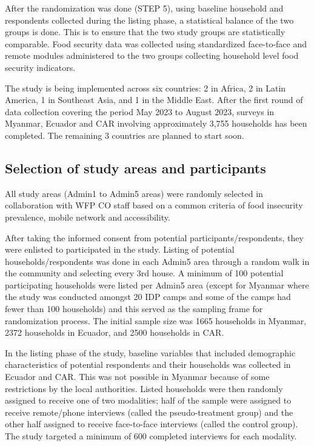 \documentclass[11pt,harvard]{article}
\begin{document}
After the randomization was done (STEP 5), using baseline household and respondents collected during the listing phase, a statistical balance of the two groups is done. This is to ensure that the two study groups are statistically comparable. Food security data was collected using standardized face-to-face and remote modules administered to the two groups collecting household level food security indicators. 

The study is being implemented across six countries: 2 in Africa, 2 in Latin America, 1 in Southeast Asia, and 1 in the Middle East. After the first round of data collection covering the period May 2023 to August 2023, surveys in Myanmar, Ecuador and CAR involving approximately 3,755 households has been completed. The remaining 3 countries are planned to start soon.

\subsection{Selection of study areas and participants}

All study areas (Admin1 to Admin5 areas) were randomly selected in collaboration with WFP CO staff based on a common criteria of food insecurity prevalence, mobile network and accessibility.

After taking the informed consent from potential participants/respondents, they were enlisted to participated in the study. Listing of potential households/respondents was done in each Admin5 area through a random walk in the community and selecting every 3rd house. A minimum of 100 potential participating households were listed per Admin5 area (except for Myanmar where the study was conducted amongst 20 IDP camps and some of the camps had fewer than 100 households) and this served as the sampling frame for randomization process. The initial sample size was 1665 households in Myanmar, 2372 households in Ecuador, and 2500 households in CAR. 

In the listing phase of the study, baseline variables that included demographic characteristics of potential respondents and their households was collected in Ecuador and CAR. This was not possible in Myanmar because of some restrictions by the local authorities. Listed households were then randomly assigned to receive one of two modalities; half of the sample were assigned to receive remote/phone interviews (called the pseudo-treatment group) and the other half assigned to receive face-to-face interviews (called the control group). The study targeted a minimum of 600 completed interviews for each modality.
\end{document}
